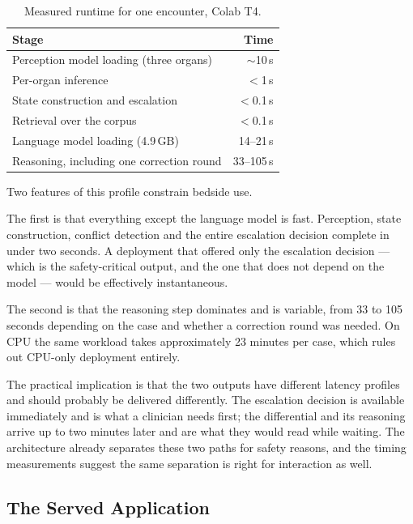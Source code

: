 \begin{table}[H]
  \centering
  \small
  \caption{Measured runtime for one encounter, Colab T4.}
  \label{tab:runtime}
  \begin{tabular}{@{}lr@{}}
    \toprule
    Stage & Time \\
    \midrule
    Perception model loading (three organs) & $\sim$10\,s \\
    Per-organ inference & $<$1\,s \\
    State construction and escalation & $<$0.1\,s \\
    Retrieval over the corpus & $<$0.1\,s \\
    Language model loading (4.9\,GB) & 14--21\,s \\
    Reasoning, including one correction round & 33--105\,s \\
    \bottomrule
  \end{tabular}
\end{table}

Two features of this profile constrain bedside use.

The first is that everything except the language model is fast. Perception, state construction,
conflict detection and the entire escalation decision complete in under two seconds. A
deployment that offered only the escalation decision --- which is the safety-critical output,
and the one that does not depend on the model --- would be effectively instantaneous.

The second is that the reasoning step dominates and is variable, from 33 to 105 seconds
depending on the case and whether a correction round was needed. On CPU the same workload takes
approximately 23 minutes per case, which rules out CPU-only deployment entirely.

The practical implication is that the two outputs have different latency profiles and should
probably be delivered differently. The escalation decision is available immediately and is what
a clinician needs first; the differential and its reasoning arrive up to two minutes later and
are what they would read while waiting. The architecture already separates these two paths for
safety reasons, and the timing measurements suggest the same separation is right for
interaction as well.

\subsection{The Served Application}
\label{subsec:deployment-service}


